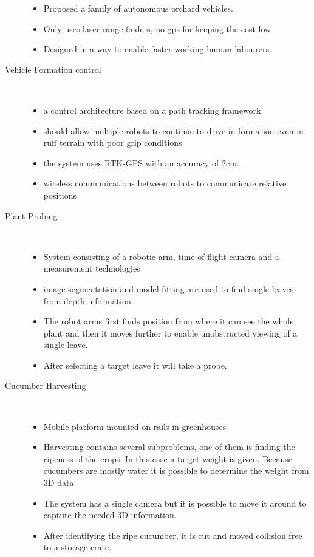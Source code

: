 \begin{description}
\begin{itemize}
            \item Proposed a family of autonomous orchard vehicles. 
            \item Only uses laser range finders, no gps for keeping the cost low
            \item Designed in a way to enable faster working human labourers.
        \end{itemize} 
        \item[Vehicle Formation control] \
        \begin{itemize}
            \item a control architecture based on a path tracking framework. 
            \item should allow multiple robots to continue to drive in formation even in ruff terrain with poor grip conditions.
            \item the system uses RTK-GPS with an accuracy of 2cm.
            \item wireless communications between robots to communicate relative positions
        \end{itemize} 
        \item[Plant Probing] \
        \begin{itemize}
            \item System consisting of a robotic arm, time-of-flight camera and a measurement technologies
            \item image segmentation and model fitting are used to find single leaves from depth information.
            \item The robot arms first finds position from where it can see the whole plant and then it moves further to enable unobstructed viewing of a single leave.
            \item After selecting a target leave it will take a probe.
        \end{itemize} 
        \item[Cucumber Harvesting] \
        \begin{itemize}
            \item Mobile platform mounted on rails in greenhouses
            \item Harvesting contains several subproblems, one of them is finding the ripeness of the crops. In this case a target weight is given. Because cucumbers are mostly water it is possible to determine the weight from 3D data.
            \item The system has a single camera but it is possible to move it around to capture the needed 3D information.
            \item After identifying the ripe cucumber, it is cut and moved collision free to a storage crate. 
        \end{itemize} 
    
    \end{description} 
